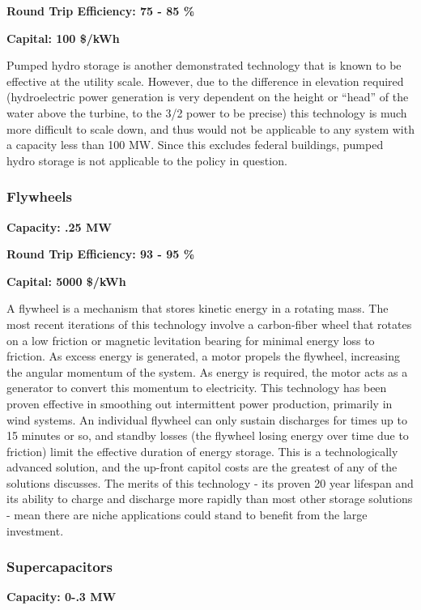 \noindent\textbf{Round Trip Efficiency: 75 - 85 \%}

\noindent\textbf{Capital: 100 \$/kWh}

Pumped hydro storage is another demonstrated technology that is known to be
effective at the utility scale. However, due to the difference in elevation
required (hydroelectric power generation is very dependent on the height or
``head'' of the water above the turbine, to the 3/2 power to be precise) this
technology is much more difficult to scale down, and thus would not be
applicable to any system with a capacity less than 100 MW. Since this excludes
federal buildings, pumped hydro storage is not applicable to the policy in
question.

\subsubsection{Flywheels}
\textbf{Capacity: .25 MW}

\noindent\textbf{Round Trip Efficiency: 93 - 95 \%}

\noindent\textbf{Capital: 5000 \$/kWh}

A flywheel is a mechanism that stores kinetic energy in a rotating mass. The
most recent iterations of this technology involve a carbon-fiber wheel that
rotates on a low friction or magnetic levitation bearing for minimal energy
loss to friction. As excess energy is generated, a motor propels the flywheel,
increasing the angular momentum of the system. As energy is required, the motor
acts as a generator to convert this momentum to electricity. This technology
has been proven effective in smoothing out intermittent power production,
primarily in wind systems. An individual flywheel can only sustain discharges
for times up to 15 minutes or so, and standby losses (the flywheel losing
energy over time due to friction) limit the effective duration of energy
storage.  This is a technologically advanced solution, and the up-front capitol
costs are the greatest of any of the solutions discusses. The merits of this
technology - its proven 20 year lifespan and its ability to charge and
discharge more rapidly than most other storage solutions - mean there are niche
applications could stand to benefit from the large investment.


\subsubsection{Supercapacitors}
\textbf{Capacity: 0-.3 MW}

